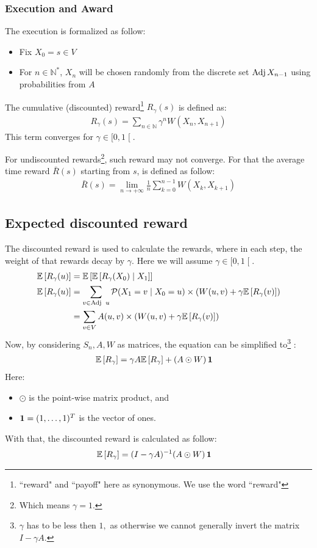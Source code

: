 \subsubsection{Execution and Award}
The execution is formalized as follow:
\begin{itemize}
	\item Fix $X_0=s\in V$
	\item For $n\in\mathbb{N}^*$, $X_n$ will be chosen randomly from the discrete set $\operatorname{Adj} X_{n-1}$ using probabilities from $A$
\end{itemize} 
The cumulative (discounted) reward\footnote{``reward" and ``payoff" here as synonymous. We use the word ``reward"} $R_\gamma(s)$ is defined as:
\begin{align}
	\label{eqn:TotalReward}
	R_\gamma(s)=\sum_{n\in\mathbb{N}}\gamma^n W(X_n,X_{n+1})
\end{align}
This term converges for $\gamma \in\mathopen [0,1\mathclose[.$


For undiscounted rewards\footnote{Which means $\gamma=1.$}, such reward may not converge. 
\newline For that the average time reward $\bar{R}(s)$ starting from $s$, is defined as follow:
\begin{align}
	\bar{R}(s)=\lim_{n\rightarrow +\infty} \frac{1}{n} \sum_{k=0}^{n-1} W(X_{k},X_{k+1})
\end{align}



\subsection{Expected discounted reward}
The discounted reward is used to calculate the rewards, where in each step, the weight of that rewards decay by $\gamma.$
\newline Here we will assume $\gamma \in\mathopen[0,1\mathclose[.$
\begin{align*}
	\mathbb{E}\left[R_\gamma(u)\right]&=
	\mathbb{E}\left[\mathbb{E}\left[R_\gamma(X_0) \mid X_1\right]\right]\\
	\mathbb{E}\left[R_\gamma(u)\right] & =\sum_{v\in \operatorname{Adj} \ u} \mathcal{P}(X_1=v\mid X_0=u)\times (W(u,v)+ \gamma \mathbb{E}\left[R_\gamma(v)\right]) \\
	&=\sum_{v\in V}  A(u,v) \times (W(u,v)+\gamma \mathbb{E}\left[R_\gamma(v)\right])
\end{align*}
Now, by considering $S_n,A,W$ as matrices, the equation can be simplified to\footnote{$\gamma$ has to be less then $1,$ as otherwise we cannot generally invert the matrix $I-\gamma A.$} :
\begin{align*}
	\mathbb{E}\left[R_\gamma\right] 
	&=\gamma A\mathbb{E}\left[R_\gamma\right]+(A\odot W)\operatorname{\mathbf{1}}
\end{align*}
Here: 
\begin{itemize}
	\item $\odot$ is the point-wise matrix product, and
	\item $\operatorname{\mathbf{1}}=(1,\dots,1)^T$ is the vector of ones.
\end{itemize}
With that, the discounted reward is calculated as follow:
\begin{align}
	\mathbb{E}\left[R_\gamma\right]&=(I-\gamma A)^{-1}  (A\odot W)\operatorname{\mathbf{1}}
\end{align}
